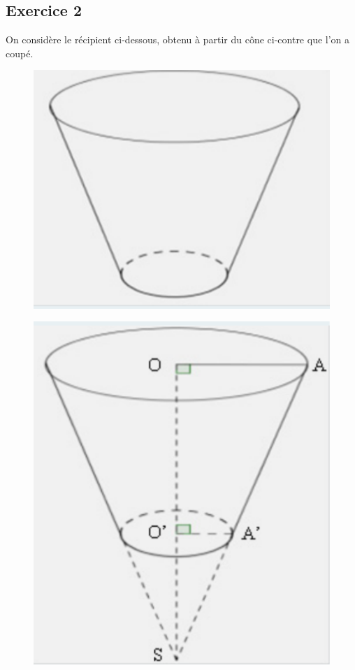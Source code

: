 \documentclass[12pt]{article}
\begin{document}
\newpage

\subsection*{Exercice 2} 

On considère le récipient ci-dessous, obtenu à partir du cône ci-contre que l’on a coupé.

\begin{multicols}{2}

  \begin{figure}[H]
    \centering
    \includegraphics[width=0.8\linewidth]{sources/cone-1.pdf}
  \end{figure}

  \begin{figure}[H]
    \centering
    \includegraphics[width=0.8\linewidth]{sources/cone-2.pdf}
  \end{figure}

\end{multicols}
\end{document}

